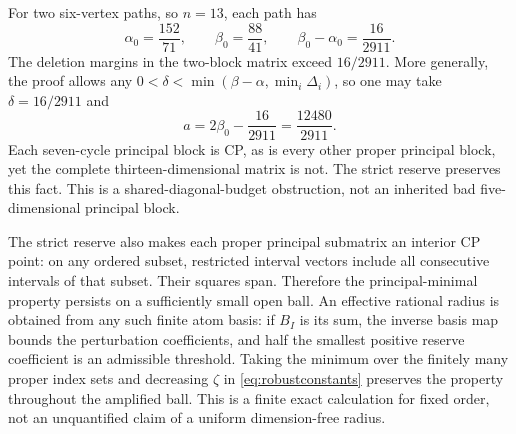 \documentclass[11pt]{article}
\theoremstyle{definition}\newtheorem{definition}[theorem]{Definition}
\theoremstyle{remark}\newtheorem{remark}[theorem]{Remark}
\begin{document}
For two six-vertex paths, so $n=13$, each path has
\[
 \alpha_0=\frac{152}{71},\qquad \beta_0=\frac{88}{41},\qquad
 \beta_0-\alpha_0=\frac{16}{2911}.
\]
The deletion margins in the two-block matrix exceed $16/2911$. More generally, the proof allows any $0<\delta<\min(\beta-\alpha,\min_i\Delta_i)$, so one may take $\delta=16/2911$ and
\[
 a=2\beta_0-\frac{16}{2911}=\frac{12480}{2911}.
\]
Each seven-cycle principal block is CP, as is every other proper principal block, yet the complete thirteen-dimensional matrix is not. The strict reserve preserves this fact. This is a shared-diagonal-budget obstruction, not an inherited bad five-dimensional principal block.

The strict reserve also makes each proper principal submatrix an interior CP point: on any ordered subset, restricted interval vectors include all consecutive intervals of that subset. Their squares span. Therefore the principal-minimal property persists on a sufficiently small open ball. An effective rational radius is obtained from any such finite atom basis: if $B_I$ is its sum, the inverse basis map bounds the perturbation coefficients, and half the smallest positive reserve coefficient is an admissible threshold. Taking the minimum over the finitely many proper index sets and decreasing $\zeta$ in \eqref{eq:robustconstants} preserves the property throughout the amplified ball. This is a finite exact calculation for fixed order, not an unquantified claim of a uniform dimension-free radius.
\end{document}
